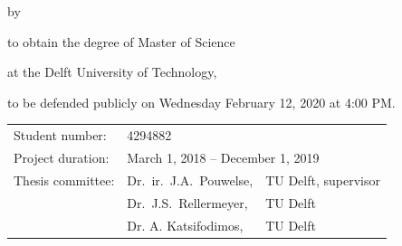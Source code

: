 \begin{titlepage}
	
	
	\begin{center}
		
		
		{\makeatletter
			\largetitlestyle\fontsize{64}{94}\selectfont\@title
			\makeatother}
		
		{\makeatletter
			\ifx\@subtitle\undefined\else
			\bigskip
			{\tudsffamily\fontsize{22}{32}\selectfont\@subtitle}    
			\fi
			\makeatother}
		
		\bigskip
		\bigskip
		
		by
		
		\bigskip
		\bigskip
		
		{\makeatletter
			\largetitlestyle\fontsize{26}{26}\selectfont\@author
			\makeatother}
		
		\bigskip
		\bigskip
		
		to obtain the degree of Master of Science
		
		at the Delft University of Technology,
		
		to be defended publicly on Wednesday February 12, 2020 at 4:00 PM.
		
		\vfill
		
		\begin{tabular}{lll}
			Student number: & 4294882 \\
			Project duration: & \multicolumn{2}{l}{March 1, 2018 -- December 1, 2019} \\
			Thesis committee: & Dr.\ ir.\  J.A.\ Pouwelse, & TU Delft, supervisor \\
			& Dr.\ J.S.\ Rellermeyer, & TU Delft \\
			& Dr. A. Katsifodimos, & TU Delft
		\end{tabular}
		
		\bigskip
		\bigskip
		

\end{center}
\end{titlepage}
